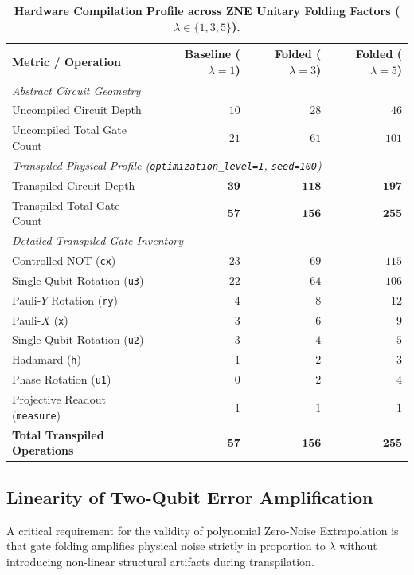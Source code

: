 \begin{table}[htbp]
\centering
\caption{\textbf{Hardware Compilation Profile across ZNE Unitary Folding Factors ($\lambda \in \{1, 3, 5\}$).}}
\label{tab:zne_folding_scaling}
\small
\begin{tabular}{lrrr}
\toprule
\textbf{Metric / Operation} & \textbf{Baseline ($\lambda = 1$)} & \textbf{Folded ($\lambda = 3$)} & \textbf{Folded ($\lambda = 5$)} \\
\midrule
\multicolumn{4}{l}{\textit{Abstract Circuit Geometry}} \\
Uncompiled Circuit Depth & $10$ & $28$ & $46$ \\
Uncompiled Total Gate Count & $21$ & $61$ & $101$ \\
\midrule
\multicolumn{4}{l}{\textit{Transpiled Physical Profile (\texttt{optimization\_level=1}, \texttt{seed=100})}} \\
Transpiled Circuit Depth & $\mathbf{39}$ & $\mathbf{118}$ & $\mathbf{197}$ \\
Transpiled Total Gate Count & $\mathbf{57}$ & $\mathbf{156}$ & $\mathbf{255}$ \\
\midrule
\multicolumn{4}{l}{\textit{Detailed Transpiled Gate Inventory}} \\
Controlled-NOT (\texttt{cx}) & $23$ & $69$ & $115$ \\
Single-Qubit Rotation (\texttt{u3}) & $22$ & $64$ & $106$ \\
Pauli-$Y$ Rotation (\texttt{ry}) & $4$ & $8$ & $12$ \\
Pauli-$X$ (\texttt{x}) & $3$ & $6$ & $9$ \\
Single-Qubit Rotation (\texttt{u2}) & $3$ & $4$ & $5$ \\
Hadamard (\texttt{h}) & $1$ & $2$ & $3$ \\
Phase Rotation (\texttt{u1}) & $0$ & $2$ & $4$ \\
Projective Readout (\texttt{measure}) & $1$ & $1$ & $1$ \\
\midrule
\textbf{Total Transpiled Operations} & $\mathbf{57}$ & $\mathbf{156}$ & $\mathbf{255}$ \\
\bottomrule
\end{tabular}
\end{table}

\subsection{Linearity of Two-Qubit Error Amplification}
A critical requirement for the validity of polynomial Zero-Noise Extrapolation is that gate folding amplifies physical noise strictly in proportion to $\lambda$ without introducing non-linear structural artifacts during transpilation. 


